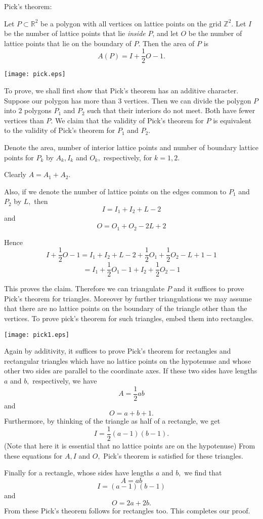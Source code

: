 \documentclass[12pt]{article}
\newcommand{\Ints}{\mathbb{Z}}
\newcommand{\Reals}{\mathbb{R}}
\begin{document}
Pick's theorem:

Let $P\subset\Reals^2$ be a polygon with all vertices on lattice points on the grid $\Ints^2$. Let $I$ be the number of lattice points that lie \emph{inside} $P$, and let
$O$ be the number of lattice points that lie on the boundary of $P$. Then the area of  $P$ is
                         $$A(P) = I + \frac{1}{2}O - 1. $$
\begin{center}
\texttt{[image: pick.eps]}
\end{center}

To prove, we shall first show that Pick's theorem has an additive character. Suppose our polygon has more than 3 vertices. Then we can divide the polygon $P$ into 2 polygons $P_1$ and $P_2$ such that their interiors do not meet. Both have fewer vertices than $P.$
We claim that the validity of Pick's theorem for $P$ is equivalent to the validity of Pick's theorem for $P_1$ and $P_2.$

Denote the area, number of interior lattice points and number of boundary lattice points for $P_k$ by $A_k, I_k$ and $O_k,$ respectively, for $k=1,2.$

Clearly $A = A_1 + A_2.$

Also, if we denote the number of lattice points on the edges common to $P_1$ and $P_2$ by $L,$ then
$$I = I_1 + I_2 + L - 2$$ and $$O = O_1 + O_2 -2L + 2$$

Hence $$I + \frac{1}{2}O - 1 =   I_1 + I_2 + L - 2 + \frac{1}{2}O_1 + \frac{1}{2}O_2 - L + 1 - 1$$
$$ = I_1 + \frac{1}{2}O_1 -1 + I_2 + \frac{1}{2}O_2 -1$$

This proves the claim. Therefore we can triangulate $P$ and it suffices to prove Pick's theorem for triangles. Moreover by further triangulations
we may assume that there are no lattice points on the boundary of the triangle other than the vertices.
To prove pick's theorem for such triangles, embed them into rectangles.

\begin{center}
\texttt{[image: pick1.eps]}
\end{center}

Again by additivity, it suffices to prove Pick's theorem for rectangles and rectangular triangles which have no lattice points on the 
hypotenuse and whose other two sides are parallel to the coordinate axes.
If these two sides have lengths $a$ and $b,$ respectively, we have $$A = \frac{1}{2}ab$$ and $$O = a+b+1.$$
Furthermore, by thinking of the triangle as half of a rectangle, we get $$I = \frac{1}{2}(a-1)(b-1).$$
(Note that here it is essential that no lattice points are on the hypotenuse)
From these equations for $A, I$ and $O,$ Pick's theorem is satisfied for these triangles.

Finally for a rectangle, whose sides have lengths $a$ and $b,$ we find that $$A = ab$$ 
$$I = (a-1)(b-1)$$ and 
$$O = 2a + 2b.$$
From these Pick's theorem follows for  rectangles too.
This completes our proof.
\end{document}

